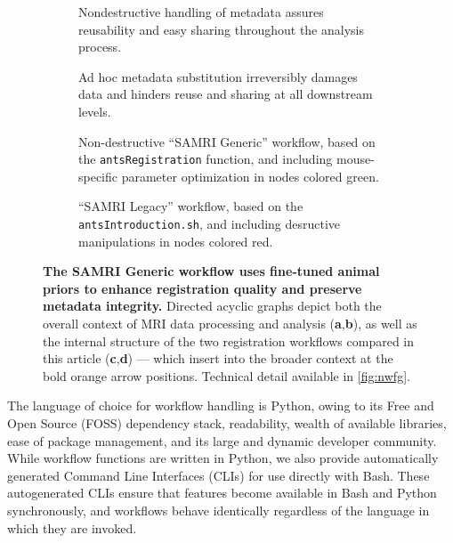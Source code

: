 \begin{figure*}[h!]
	\vspace{-1.8em}
	\begin{subfigure}{\textwidth}
		\centering
		\vspace{-3em}
		\caption{
			Nondestructive handling of metadata assures reusability and easy sharing throughout the analysis process.
			}
		\label{fig:mdg}
	\vspace{-0.3em}
	\end{subfigure}
	\begin{subfigure}{\textwidth}
		\centering
		\vspace{-3em}
		\caption{
			Ad hoc metadata substitution irreversibly damages data and hinders reuse and sharing at all downstream levels.
			}
		\label{fig:mdb}
	\vspace{-0.5em}
	\end{subfigure}
	\begin{subfigure}{.58\textwidth}
		\centering
		\vspace{-2.1em}
		\caption{
			Non-destructive “SAMRI Generic” workflow, based on the \textcolor{mg}{\texttt{antsRegistration}} function, and including mouse-specific parameter optimization in nodes colored green.
			}
		\label{fig:wfgg}
	\end{subfigure}\hfill
	\begin{subfigure}{.39\textwidth}
		\centering
		\vspace{-1.0em}
		\caption{
			“SAMRI Legacy” workflow, based on the \textcolor{mg}{\texttt{antsIntroduction.sh}}, and including desructive manipulations in nodes colored red.
			}
		\label{fig:wfgl}
	\end{subfigure}
	\caption{
		\textbf{The SAMRI Generic workflow uses fine-tuned animal priors to enhance registration quality and preserve metadata integrity.}
		Directed acyclic graphs depict both the overall context of MRI data processing and analysis (\textbf{a},\textbf{b}), as well as the internal structure of the two registration workflows compared in this article (\textbf{c},\textbf{d}) --- which insert into the broader context at the bold orange arrow positions.
		Technical detail available in \cref{fig:nwfg}.
		}
	\label{fig:wfg}
\end{figure*}

The language of choice for workflow handling is Python, owing to its Free and Open Source (FOSS) dependency stack, readability, wealth of available libraries, ease of package management, and its large and dynamic developer community.
While workflow functions are written in Python, we also provide automatically generated Command Line Interfaces (CLIs) for use directly with Bash.
These autogenerated CLIs ensure that features become available in Bash and Python synchronously, and workflows behave identically regardless of the language in which they are invoked.

